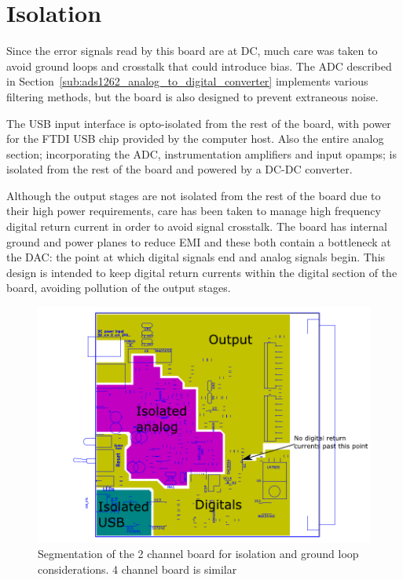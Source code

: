 \documentclass[11pt]{report}
\begin{document}
\section{Isolation}

Since the error signals read by this board are at DC, much care was taken to avoid ground loops and crosstalk that could introduce bias. The ADC described in Section~\ref{sub:ads1262_analog_to_digital_converter} implements various filtering methods, but the board is also designed to prevent extraneous noise. 

The USB input interface is opto-isolated from the rest of the board, with power for the FTDI USB chip provided by the computer host. Also the entire analog section; incorporating the ADC, instrumentation amplifiers and input opamps; is isolated from the rest of the board and powered by a DC-DC converter. 

Although the output stages are not isolated from the rest of the board due to their high power requirements, care has been taken to manage high frequency digital return current in order to avoid signal crosstalk. The board has internal ground and power planes to reduce EMI and these both contain a bottleneck at the DAC: the point at which digital signals end and analog signals begin. This design is intended to keep digital return currents within the digital section of the board, avoiding pollution of the output stages. 

\begin{figure}[h!]
	\centering
	\includegraphics[width=\textwidth]{BoardIsolation/BoardIsolation}
	\caption{Segmentation of the 2 channel board for isolation and ground loop considerations. 4 channel board is similar}
	\label{fig:isolation}
\end{figure}
\end{document}
